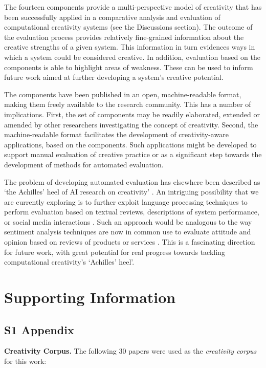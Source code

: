 \documentclass[10pt,letterpaper]{article}
\begin{document}
The fourteen components provide a multi-perspective model of creativity that has been successfully applied in a comparative analysis and evaluation of computational creativity systems \cite{jordanous12cc,jordanousphd,jordanous16aisb} (see the Discussions section). The outcome of the evaluation process provides relatively fine-grained information about the creative strengths of a given system. This information in turn evidences ways in which a system could be considered creative. In addition, evaluation based on the components is able to highlight areas of weakness. These can be used to inform future work aimed at further developing a system's creative potential.

The components have been published in an open, machine-readable format, making them freely available to the research community. This has a number of implications. First, the set of components may be readily elaborated, extended or amended by other researchers investigating the concept of creativity. Second, the machine-readable format facilitates the development of creativity-aware applications, based on the components. Such applications might be developed to support manual evaluation of creative practice or as a significant step towards the development of methods for automated evaluation.

The problem of developing automated evaluation has elsewhere been described as `the Achilles' heel of AI research on creativity' \cite{boden99}.  An intriguing possibility that we are currently exploring is to further exploit language processing techniques to perform evaluation based on textual reviews, descriptions of system performance, or social media interactions \cite{jordanous15vem}. Such an approach would be analogous to the way sentiment analysis techniques are now in common use to evaluate attitude and opinion based on reviews of products or services \cite{panglee08}. This is a fascinating direction for future work, with great potential for real progress towards tackling computational creativity's `Achilles' heel'.




\section*{Supporting Information}


\subsection*{S1 Appendix}\label{S1_Appendix}
{\bf Creativity Corpus.}  The following 30 papers were used as the {\em creativity corpus} for this work:
\end{document}
